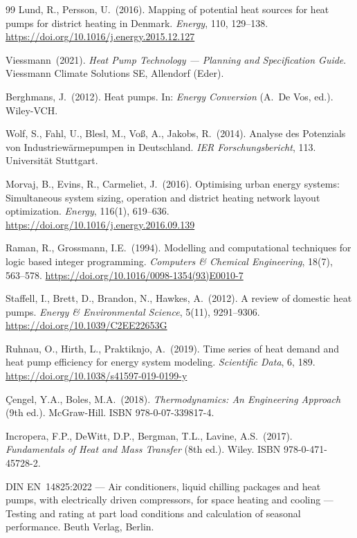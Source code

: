 \documentclass[a4paper,12pt]{article}
\begin{document}
\begin{thebibliography}{99}
Lund, R., Persson, U.\ (2016).
Mapping of potential heat sources for heat pumps for district heating in Denmark.
\textit{Energy}, 110, 129--138.
\url{https://doi.org/10.1016/j.energy.2015.12.127}

Viessmann\ (2021).
\textit{Heat Pump Technology --- Planning and Specification Guide}.
Viessmann Climate Solutions SE, Allendorf (Eder).

Berghmans, J.\ (2012).
Heat pumps. In: \textit{Energy Conversion} (A.\ De Vos, ed.). Wiley-VCH.

Wolf, S., Fahl, U., Blesl, M., Vo\ss{}, A., Jakobs, R.\ (2014).
Analyse des Potenzials von Industriew\"{a}rmepumpen in Deutschland.
\textit{IER Forschungsbericht}, 113. Universit\"{a}t Stuttgart.

Morvaj, B., Evins, R., Carmeliet, J.\ (2016).
Optimising urban energy systems: Simultaneous system sizing, operation and district
heating network layout optimization.
\textit{Energy}, 116(1), 619--636.
\url{https://doi.org/10.1016/j.energy.2016.09.139}

Raman, R., Grossmann, I.E.\ (1994).
Modelling and computational techniques for logic based integer programming.
\textit{Computers \& Chemical Engineering}, 18(7), 563--578.
\url{https://doi.org/10.1016/0098-1354(93)E0010-7}

Staffell, I., Brett, D., Brandon, N., Hawkes, A.\ (2012).
A review of domestic heat pumps.
\textit{Energy \& Environmental Science}, 5(11), 9291--9306.
\url{https://doi.org/10.1039/C2EE22653G}

Ruhnau, O., Hirth, L., Praktiknjo, A.\ (2019).
Time series of heat demand and heat pump efficiency for energy system modeling.
\textit{Scientific Data}, 6, 189.
\url{https://doi.org/10.1038/s41597-019-0199-y}

\c{C}engel, Y.A., Boles, M.A.\ (2018).
\textit{Thermodynamics: An Engineering Approach} (9th ed.). McGraw-Hill.
ISBN 978-0-07-339817-4.

Incropera, F.P., DeWitt, D.P., Bergman, T.L., Lavine, A.S.\ (2017).
\textit{Fundamentals of Heat and Mass Transfer} (8th ed.). Wiley.
ISBN 978-0-471-45728-2.

DIN EN~14825:2022 --- Air conditioners, liquid chilling packages and heat pumps, with
electrically driven compressors, for space heating and cooling --- Testing and rating at
part load conditions and calculation of seasonal performance.
Beuth Verlag, Berlin.


\end{thebibliography}
\end{document}

